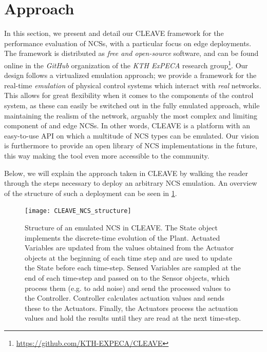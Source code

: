 \section{Approach}\label{sec:approach}

In this section, we present and detail our \ac{CLEAVE} framework for the performance evaluation of \acfp{NCS}, with a particular focus on edge deployments.
The framework is distributed as \emph{free and open-source} software, and can be found online in the \emph{GitHub} organization of the \emph{KTH ExPECA} research group\footnote{\url{https://github.com/KTH-EXPECA/CLEAVE}}.
Our design follows a virtualized emulation approach; we provide a framework for the real-time \emph{emulation} of physical control systems which interact with \emph{real} networks.
This allows for great flexibility when it comes to the components of the control system, as these can easily be switched out in the fully emulated approach, while maintaining the realism of the network, arguably the most complex and limiting component of and edge \acp{NCS}.
In other words, \ac{CLEAVE} is a platform with an easy-to-use \ac{API} on which a multitude of \ac{NCS} types can be emulated.
Our vision is furthermore to provide an open library of \ac{NCS} implementations in the future, this way making the tool even more accessible to the community.

Below, we will explain the approach taken in \ac{CLEAVE} by walking the reader through the steps necessary to deploy an arbitrary \ac{NCS} emulation.
An overview of the structure of such a deployment can be seen in \cref{fig:cleave:ncs:struct}.

\begin{figure}
    \centering
    \texttt{[image: CLEAVE\_NCS\_structure]}
    \caption{
        Structure of an emulated \ac{NCS} in \ac{CLEAVE}.\@
        The State object implements the discrete-time evolution of the Plant.
        Actuated Variables are updated from the values obtained from the Actuator objects at the beginning of each time step and are used to update the State before each time-step.
        Sensed Variables are sampled at the end of each time-step and passed on to the Sensor objects, which process them (e.g. to add noise) and send the processed values to the Controller.
        Controller calculates actuation values and sends these to the Actuators.
        Finally, the Actuators process the actuation values and hold the results until they are read at the next time-step.
    }\label{fig:cleave:ncs:struct}
\end{figure}

